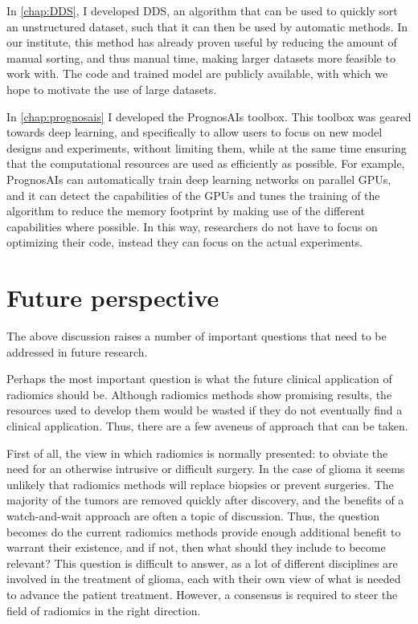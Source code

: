 In \cref{chap:DDS}, I developed \gls{DDS}, an algorithm that can be used to quickly sort an unstructured dataset, such that it can then be used by automatic methods.
In our institute, this method has already proven useful by reducing the amount of manual sorting, and thus manual time, making larger datasets more feasible to work with.
The code and trained model are publicly available, with which we hope to motivate the use of large datasets.

In \cref{chap:prognosais} I developed the PrognosAIs toolbox.
This toolbox was geared towards deep learning, and specifically to allow users to focus on new model designs and experiments, without limiting them, while at the same time ensuring that the computational resources are used as efficiently as possible.
For example, PrognosAIs can automatically train deep learning networks on parallel GPUs, and it can detect the capabilities of the GPUs and tunes the training of the algorithm to reduce the memory footprint by making use of the different capabilities where possible.
In this way, researchers do not have to focus on optimizing their code, instead they can focus on the actual experiments.


\section{Future perspective}

The above discussion raises a number of important questions that need to be addressed in future research.

Perhaps the most important question is what the future clinical application of radiomics should be.
Although radiomics methods show promising results, the resources used to develop them would be wasted if they do not eventually find a clinical application.
Thus, there are a few aveneus of approach that can be taken.

First of all, the view in which radiomics is normally presented: to obviate the need for an otherwise intrusive or difficult surgery.
In the case of glioma it seems unlikely that radiomics methods will replace biopsies or prevent surgeries.
The majority of the \glspl{tumor} are removed quickly after discovery, and the benefits of a watch-and-wait approach are often a topic of discussion.
Thus, the question becomes do the current radiomics methods provide enough additional benefit to warrant their existence, and if not, then what should they include to become relevant?
This question is difficult to answer, as a lot of different disciplines are involved in the treatment of glioma, each with their own view of what is needed to advance the patient treatment.
However, a consensus is required to steer the field of radiomics in the right direction.

